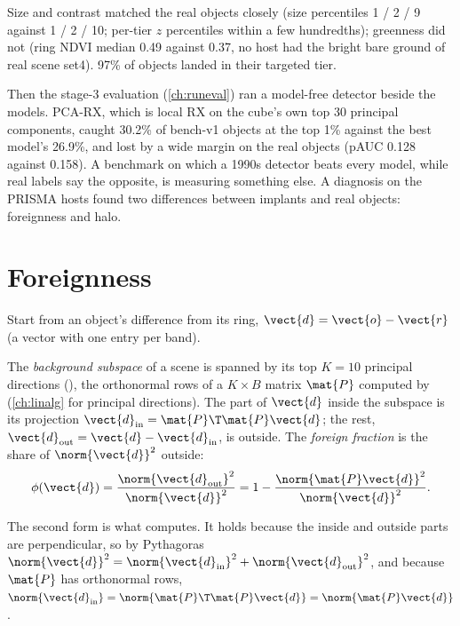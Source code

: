 Size and contrast matched the real objects closely (size percentiles 1 / 2 / 9 against 1 / 2 / 10; per-tier $z$
percentiles within a few hundredths); greenness did not (ring NDVI median 0.49 against 0.37, no host had the bright
bare ground of real scene set4). 97\% of objects landed in their targeted tier.

Then the stage-3 evaluation (\cref{ch:runeval}) ran a model-free detector beside the models. PCA-RX, which is local RX
on the cube's own top 30 principal components, caught 30.2\% of bench-v1 objects at the top 1\% against the best
model's 26.9\%, and lost by a wide margin on the real objects (pAUC 0.128 against 0.158)\hfil{}\hfilneg{}. A
benchmark on which a 1990s detector beats every model, while real labels say the opposite, is measuring something
else. A diagnosis on the PRISMA hosts found two differences between implants and real objects: foreignness and halo.

\section{Foreignness}\label{sec:benchmarks:foreign}

Start from an object's difference from its ring, $\vect{d} = \vect{o} - \vect{r}$ (a vector with one entry per band).

\begin{definition}
The \emph{background subspace} of a scene is spanned by its top $K = 10$ principal
directions (), the orthonormal rows of a $K \times B$ matrix $\mat{P}$ computed by
 (\cref{ch:linalg} for principal directions). The part of $\vect{d}$ inside the subspace is
its projection $\vect{d}_{\text{in}} = \mat{P}\T\mat{P}\vect{d}$; the rest, $\vect{d}_{\text{out}} = \vect{d} -
\vect{d}_{\text{in}}$, is outside. The \emph{foreign fraction} is the share of $\norm{\vect{d}}^2$
outside:
\begin{equation}\label{eq:benchmarks:foreign}
\phi(\vect{d}) = \frac{\norm{\vect{d}_{\text{out}}}^2}{\norm{\vect{d}}^2} = 1 - \frac{\norm{\mat{P}\vect{d}}^2}{\norm{\vect{d}}^2}.
\end{equation}
\end{definition}

The second form is what  computes. It holds because the inside and outside parts are
perpendicular, so by Pythagoras $\norm{\vect{d}}^2 = \norm{\vect{d}_{\text{in}}}^2 + \norm{\vect{d}_{\text{out}}}^2$,
and because $\mat{P}$ has orthonormal rows, $\norm{\vect{d}_{\text{in}}} = \norm{\mat{P}\T\mat{P}\vect{d}} =
\norm{\mat{P}\vect{d}}$.

